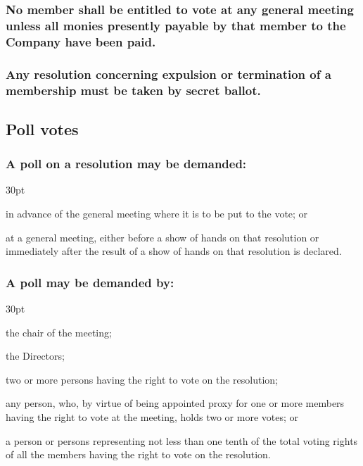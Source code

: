 \documentclass[12pt]{article}
\def\clauseindent{30pt}
\newenvironment{subindentpara}{\raggedright\begin{adjustwidth}{\clauseindent}{}\begin{hanginglist}}{\end{hanginglist}\end{adjustwidth}}
\begin{document}
\subsubsection[Member may not vote unless all monies payable paid]{No member shall be entitled to vote at any general meeting unless all monies presently payable by that member to the Company have been paid.}
\subsubsection[Votes on expulsion/termination by secret ballot only]{Any resolution concerning expulsion or termination of a membership must be taken by secret ballot.}

\subsection{Poll votes}
\subsubsection[Specifics of poll on resolution]{A poll on a resolution may be demanded:}
\begin{subindentpara}
    \item in advance of the general meeting where it is to be put to the vote; or
    \item at a general meeting, either before a show of hands on that resolution or immediately after the result of a show of hands on that resolution is declared.
\end{subindentpara}
\subsubsection[Specifics of poll demand]{A poll may be demanded by:}
\begin{subindentpara}
    \item the chair of the meeting;
    \item the Directors;
    \item two or more persons having the right to vote on the resolution;
    \item any person, who, by virtue of being appointed proxy for one or more members having the right to vote at the meeting, holds two or more votes; or
    \item a person or persons representing not less than one tenth of the total voting rights of all the members having the right to vote on the resolution.
\end{subindentpara}
\end{document}
